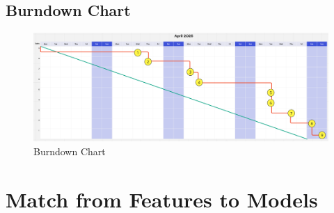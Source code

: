 \documentclass{article}
\begin{document}
\subsection*{Burndown Chart}

\begin{figure}[h]
  \centering
  \includegraphics[width=\textwidth]{images/burndown.png}
  \caption{Burndown Chart}
  \label{fig:burndown_chart}
\end{figure}



  


\section*{Match from Features to Models}
\end{document}
